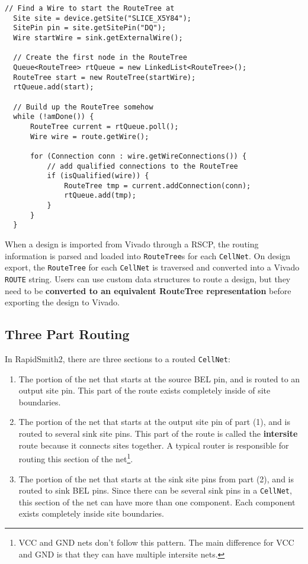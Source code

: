 \begin{lstlisting}[xleftmargin=1.5em, framexleftmargin=1.5em, caption=Building a
RouteTree, label=code:routeTree] 
  // Find a Wire to start the RouteTree at
  Site site = device.getSite("SLICE_X5Y84");
  SitePin pin = site.getSitePin("DQ");
  Wire startWire = sink.getExternalWire();

  // Create the first node in the RouteTree 
  Queue<RouteTree> rtQueue = new LinkedList<RouteTree>();
  RouteTree start = new RouteTree(startWire);
  rtQueue.add(start);

  // Build up the RouteTree somehow 
  while (!amDone()) {
	  RouteTree current = rtQueue.poll();
	  Wire wire = route.getWire();

	  for (Connection conn : wire.getWireConnections()) {
		  // add qualified connections to the RouteTree
		  if (isQualified(wire)) {
			  RouteTree tmp = current.addConnection(conn);
			  rtQueue.add(tmp);
		  }
	  }
  }
\end{lstlisting}

When a design is imported from Vivado through a RSCP, the routing information
is parsed and loaded into \texttt{Route\-Tree}s for each \texttt{CellNet}. On
design export, the \texttt{RouteTree} for each \texttt{CellNet} is traversed
and converted into a Vivado \texttt{ROUTE} string. Users can use custom data
structures to route a design, but they need to be \textbf{converted to an
equivalent RouteTree representation} before exporting the design to Vivado.  

\subsection{Three Part Routing} \label{sec:threePartRouting}
In RapidSmith2, there are three sections to a routed \texttt{CellNet}: 

\begin{enumerate}
  \item The portion of the net that starts at the source BEL pin, and is routed
  to an output site pin. This part of the route exists completely inside of
  site boundaries.
  
  \item The portion of the net that starts at the output site pin of part (1),
  and is routed to several sink site pins. This part of the route is
  called the \textbf{intersite} route because it connects sites together. A
  typical router is responsible for routing this section of the
  net\footnote{VCC and GND nets don't follow this pattern. The main difference
  for VCC and GND is that they can have multiple intersite nets.}.
  
  \item The portion of the net that starts at the sink site pins from part (2),
  and is routed to sink BEL pins. Since there can be several sink pins in a
  \texttt{CellNet}, this section of the net can have more than one component.
  Each component exists completely inside site boundaries.
\end{enumerate}


